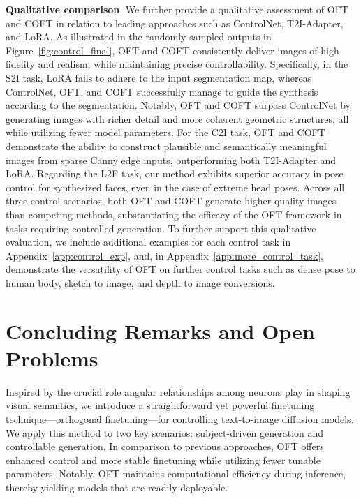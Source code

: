 \textbf{Qualitative comparison}. We further provide a qualitative assessment of OFT and COFT in relation to leading approaches such as ControlNet, T2I-Adapter, and LoRA. As illustrated in the randomly sampled outputs in Figure~\ref{fig:control_final}, OFT and COFT consistently deliver images of high fidelity and realism, while maintaining precise controllability. Specifically, in the S2I task, LoRA fails to adhere to the input segmentation map, whereas ControlNet, OFT, and COFT successfully manage to guide the synthesis according to the segmentation. Notably, OFT and COFT surpass ControlNet by generating images with richer detail and more coherent geometric structures, all while utilizing fewer model parameters. For the C2I task, OFT and COFT demonstrate the ability to construct plausible and semantically meaningful images from sparse Canny edge inputs, outperforming both T2I-Adapter and LoRA. Regarding the L2F task, our method exhibits superior accuracy in pose control for synthesized faces, even in the case of extreme head poses. Across all three control scenarios, both OFT and COFT generate higher quality images than competing methods, substantiating the efficacy of the OFT framework in tasks requiring controlled generation. To further support this qualitative evaluation, we include additional examples for each control task in Appendix~\ref{app:control_exp}, and, in Appendix~\ref{app:more_control_task}, demonstrate the versatility of OFT on further control tasks such as dense pose to human body, sketch to image, and depth to image conversions.

\section{Concluding Remarks and Open Problems}

Inspired by the crucial role angular relationships among neurons play in shaping visual semantics, we introduce a straightforward yet powerful finetuning technique—orthogonal finetuning—for controlling text-to-image diffusion models. We apply this method to two key scenarios: subject-driven generation and controllable generation. In comparison to previous approaches, OFT offers enhanced control and more stable finetuning while utilizing fewer tunable parameters. Notably, OFT maintains computational efficiency during inference, thereby yielding models that are readily deployable.


